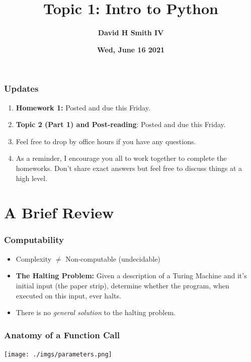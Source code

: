 \documentclass{beamer}
\title{\textbf{Topic 1: Intro to Python}}
\author{\textbf{David H Smith IV}}
\institute[\textbf{UIUC}]{\textbf{University of Illinois Urbana-Champaign}}
\date{\textbf{Wed, June 16 2021}}
\begin{document}
\frame{\titlepage}

\begin{frame}
  \frametitle{Updates}
  \begin{enumerate}
    \item \textbf{Homework 1:} Posted and due this Friday.
    \item \textbf{Topic 2 (Part 1) and Post-reading}: Posted and due this Friday.
    \item Feel free to drop by office hours if you have any questions.
    \item As a reminder, I encourage you all to work together to complete the homeworks. Don't share exact answers but feel free to discuss things at a high level.
  \end{enumerate}
\end{frame}

\section{A Brief Review}

\begin{frame}
  \frametitle{Computability}
  \begin{itemize}
    \item Complexity $\neq$ Non-computable (undecidable)
      \pause
    \item \textbf{The Halting Problem: }Given a description of a Turing Machine and it's initial input (the paper strip), determine whether the program, when executed on this input, ever halts.
      \pause
    \item There is no \textit{general solution} to the halting problem.
  \end{itemize}
\end{frame}

\begin{frame}
  \frametitle{Anatomy of a Function Call}
  \centering
  \texttt{[image: ./imgs/parameters.png]}
\end{frame}
\end{document}
